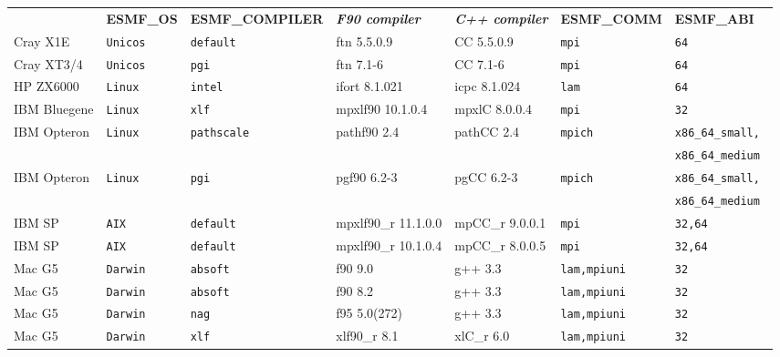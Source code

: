 \begin{tabular}{lllllll}
  &{\bfseries\footnotesize ESMF\_OS} &{\bfseries\footnotesize ESMF\_COMPILER} & {\bfseries\footnotesize\it F90 compiler} & {\bfseries\footnotesize\it C++ compiler} & {\bfseries\footnotesize ESMF\_COMM} & {\bfseries\footnotesize ESMF\_ABI} \\

Cray X1E        &\tt Unicos &\tt default & ftn \footnotesize 5.5.0.9 & CC \footnotesize 5.5.0.9 &\tt mpi &\tt 64 \\
Cray XT3/4      &\tt Unicos &\tt pgi     & ftn \footnotesize 7.1-6   & CC \footnotesize 7.1-6 &\tt mpi &\tt 64 \\
HP ZX6000       &\tt Linux  &\tt intel   & ifort \footnotesize 8.1.021 & icpc \footnotesize 8.1.024 &\tt lam &\tt 64 \\
IBM Bluegene    &\tt Linux  &\tt xlf     & mpxlf90 \footnotesize 10.1.0.4 & mpxlC \footnotesize 8.0.0.4 &\tt mpi &\tt 32 \\
IBM Opteron     &\tt Linux  &\tt pathscale & pathf90 \footnotesize 2.4 & pathCC \footnotesize 2.4 &\tt mpich &\tt x86\_64\_small, \\
                &           &              &                           &                          &          &\tt x86\_64\_medium \\
IBM Opteron     &\tt Linux  &\tt pgi     & pgf90 \footnotesize 6.2-3 & pgCC \footnotesize 6.2-3 &\tt mpich   &\tt x86\_64\_small, \\
                &           &            &                           &                          &            &\tt x86\_64\_medium \\
IBM SP          &\tt AIX    &\tt default & mpxlf90\_r \footnotesize 11.1.0.0 & mpCC\_r \footnotesize 9.0.0.1 &\tt mpi &\tt 32,64 \\
IBM SP          &\tt AIX    &\tt default & mpxlf90\_r \footnotesize 10.1.0.4 & mpCC\_r \footnotesize 8.0.0.5 &\tt mpi &\tt 32,64 \\
Mac G5          &\tt Darwin &\tt absoft  & f90 \footnotesize 9.0     & g++ \footnotesize 3.3    &\tt lam,mpiuni &\tt 32 \\
Mac G5          &\tt Darwin &\tt absoft  & f90 \footnotesize 8.2     & g++ \footnotesize 3.3    &\tt lam,mpiuni &\tt 32 \\
Mac G5          &\tt Darwin &\tt nag     & f95 \footnotesize 5.0(272)& g++ \footnotesize 3.3    &\tt lam,mpiuni &\tt 32 \\
Mac G5          &\tt Darwin &\tt xlf     & xlf90\_r \footnotesize 8.1& xlC\_r \footnotesize 6.0 &\tt lam,mpiuni &\tt 32 \\

\end{tabular}
